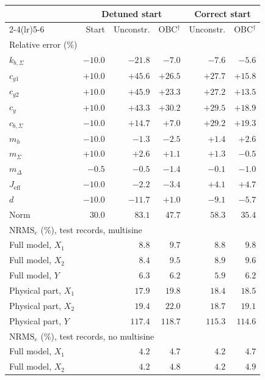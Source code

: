 \setlength{\tabcolsep}{3pt}
\begin{tabular}{l r r r r r}
\toprule
 & \multicolumn{3}{c}{Detuned start} & \multicolumn{2}{c}{Correct start}\\
\cmidrule(lr){2-4}\cmidrule(lr){5-6}
 & Start & Unconstr. & OBC$^\dagger$ & Unconstr. & OBC$^\dagger$\\
\midrule
\multicolumn{6}{l}{Relative error (\%)}\\
$k_{b,\Sigma}$ & $-10.0$ & $-21.8$ & $-7.0$ & $-7.6$ & $-5.6$\\
$c_{g1}$ & $+10.0$ & $+45.6$ & $+26.5$ & $+27.7$ & $+15.8$\\
$c_{g2}$ & $+10.0$ & $+45.9$ & $+23.3$ & $+27.2$ & $+13.5$\\
$c_y$ & $+10.0$ & $+43.3$ & $+30.2$ & $+29.5$ & $+18.9$\\
$c_{b,\Sigma}$ & $-10.0$ & $+14.7$ & $+7.0$ & $+29.2$ & $+19.3$\\
$m_h$ & $-10.0$ & $-1.3$ & $-2.5$ & $+1.4$ & $+2.6$\\
$m_\Sigma$ & $+10.0$ & $+2.6$ & $+1.1$ & $+1.3$ & $-0.5$\\
$m_\Delta$ & $-0.5$ & $-0.5$ & $-1.4$ & $-0.1$ & $-1.0$\\
$J_{\mathrm{eff}}$ & $-10.0$ & $-2.2$ & $-3.4$ & $+4.1$ & $+4.7$\\
$d$ & $-10.0$ & $-11.7$ & $+1.0$ & $-9.1$ & $-5.7$\\
Norm & $30.0$ & $83.1$ & $47.7$ & $58.3$ & $35.4$\\
\midrule
\multicolumn{6}{l}{$\mathrm{NRMS}_e$ (\%), test records, multisine}\\
Full model, $X_1$ &  & $8.8$ & $9.7$ & $8.8$ & $9.8$\\
Full model, $X_2$ &  & $8.4$ & $9.5$ & $8.9$ & $9.6$\\
Full model, $Y$ &  & $6.3$ & $6.2$ & $5.9$ & $6.2$\\
Physical part, $X_1$ &  & $17.9$ & $19.8$ & $18.4$ & $18.5$\\
Physical part, $X_2$ &  & $19.4$ & $22.0$ & $18.7$ & $19.1$\\
Physical part, $Y$ &  & $117.4$ & $118.7$ & $115.3$ & $114.6$\\
\midrule
\multicolumn{6}{l}{$\mathrm{NRMS}_e$ (\%), test records, no multisine}\\
Full model, $X_1$ &  & $4.2$ & $4.7$ & $4.2$ & $4.7$\\
Full model, $X_2$ &  & $4.2$ & $4.8$ & $4.2$ & $4.9$\\

\end{tabular}
